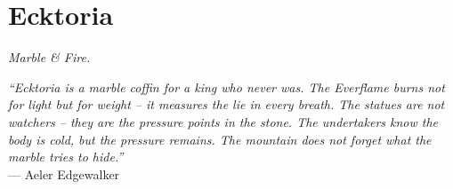 \documentclass[12pt,oneside]{book}
\begin{document}


\newpage

\chapter{Ecktoria}
\emph{Marble \& Fire.}

\noindent
\textit{``Ecktoria is a marble coffin for a king who never was. The Everflame burns not for light but for weight -- it measures the lie in every breath. The statues are not watchers -- they are the pressure points in the stone. The undertakers know the body is cold, but the pressure remains. The mountain does not forget what the marble tries to hide.''} \\
--- Aeler Edgewalker
\end{document}
